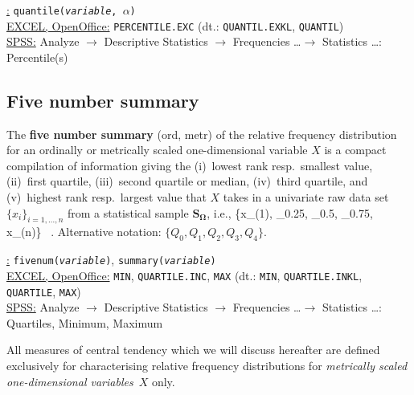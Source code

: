 \medskip
\noindent
\underline{\R:} \texttt{quantile(\textit{variable}, $\alpha$)} \\
\underline{EXCEL, OpenOffice:} \texttt{PERCENTILE.EXC}
(dt.: \texttt{QUANTIL.EXKL}, \texttt{QUANTIL}) \\
\underline{SPSS:} Analyze $\rightarrow$ Descriptive Statistics
$\rightarrow$ Frequencies \ldots $\rightarrow$ Statistics
\ldots: Percentile(s)

\subsection[Five number summary]{Five number summary}
The \textbf{five number summary} (ord, metr) of the relative 
frequency distribution for an ordinally or metrically scaled 
one-dimensional variable $X$ is a compact compilation of 
information giving the (i)~lowest rank resp.\ smallest value, 
(ii)~first quartile, (iii)~second quartile or median, (iv)~third 
quartile, and (v)~highest rank resp.\ largest value that $X$ takes 
in a univariate raw data set $\{x_{i}\}_{i=1,\ldots,n}$ from a 
statistical sample $\boldsymbol{S_{\Omega}}$, i.e.,
%
\be
\{x_{(1)}, _{0.25}, _{0.5},
_{0.75}, x_{(n)}\} \ .
\ee
%
Alternative notation: $\{Q_{0}, Q_{1}, Q_{2}, Q_{3}, Q_{4}\}$.

\medskip
\noindent
\underline{\R:} \texttt{fivenum(\textit{variable})},
\texttt{summary(\textit{variable})} \\
\underline{EXCEL, OpenOffice:} \texttt{MIN}, \texttt{QUARTILE.INC},
\texttt{MAX} (dt.: \texttt{MIN}, \texttt{QUARTILE.INKL},
\texttt{QUARTILE}, \texttt{MAX})\\
\underline{SPSS:} Analyze $\rightarrow$ Descriptive Statistics
$\rightarrow$ Frequencies \ldots $\rightarrow$ Statistics
\ldots: Quartiles, Minimum, Maximum

\medskip
\noindent
All measures of central tendency which we will discuss hereafter 
are defined exclusively for characterising relative frequency 
distributions for \textit{metrically scaled one-dimensional 
variables}~$X$ only.

